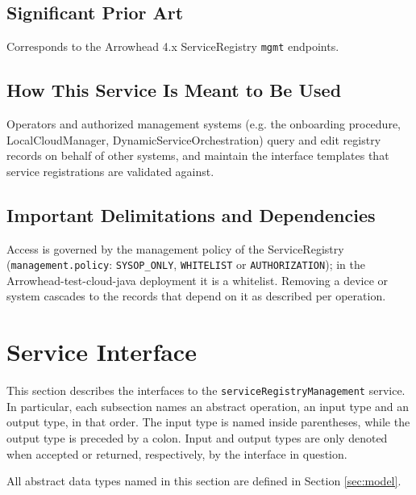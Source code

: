 \documentclass[a4paper]{arrowhead}
\begin{document}
\subsection{Significant Prior Art}

Corresponds to the Arrowhead 4.x ServiceRegistry \texttt{mgmt} endpoints.

\subsection{How This Service Is Meant to Be Used}

Operators and authorized management systems (e.g. the onboarding procedure, LocalCloudManager, Dynamic\allowbreak{}Service\allowbreak{}Orchestration) query and edit registry records on behalf of other systems, and maintain the interface templates that service registrations are validated against.

\subsection{Important Delimitations and Dependencies}
\label{sec:delimitations}

Access is governed by the management policy of the ServiceRegistry (\texttt{management.\allowbreak{}policy}: \texttt{SYSOP\_\allowbreak{}ONLY}, \texttt{WHITELIST} or \texttt{AUTHORIZATION}); in the Arrowhead-test-cloud-java deployment it is a whitelist. Removing a device or system cascades to the records that depend on it as described per operation.

\newpage

\section{Service Interface}
\label{sec:operations}

This section describes the interfaces to the \texttt{service\allowbreak{}Registry\allowbreak{}Management} service.
In particular, each subsection names an abstract operation, an input type and an output type, in that order.
The input type is named inside parentheses, while the output type is preceded by a colon.
Input and output types are only denoted when accepted or returned, respectively, by the interface in question.

All abstract data types named in this section are defined in Section \ref{sec:model}.
\end{document}
